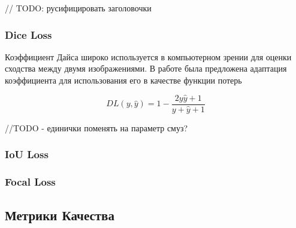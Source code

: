 // TODO: русифицировать заголовочки

\subsubsection{Dice Loss} 

Коэффициент Дайса широко используется в компьютерном зрении для оценки сходства 
между двумя изображениями. В работе \cite{Dice} была предложена адаптация коэффициента 
для использования его в качестве функции потерь 

\begin{equation}
    DL(y, \hat{y} ) = 1 - \frac{2y\hat{y} + 1}{y + \hat{y} + 1}
\end{equation}

//TODO - единички поменять на параметр смуз? 


\subsubsection{IoU Loss}

\subsubsection{Focal Loss}


\subsection{Метрики Качества}
